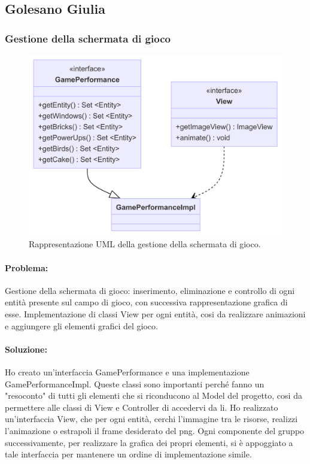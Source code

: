 \documentclass[a4paper,12pt]{report}
\begin{document}
\subsection{Golesano Giulia}

\subsubsection{Gestione della schermata di gioco }

\begin{figure}[H]
\centering{}
\includegraphics[width=\textwidth]{img/game.png}
\caption{Rappresentazione UML della gestione della schermata di gioco.}
\end{figure}

\paragraph{Problema:}
Gestione della schermata di gioco: inserimento, eliminazione e controllo di ogni entità presente sul campo di gioco, con successiva rappresentazione grafica di esse.
Implementazione di classi View per ogni entità, cosi da realizzare animazioni e aggiungere gli elementi grafici del gioco.

\paragraph{Soluzione:}
Ho creato un'interfaccia GamePerformance e una implementazione GamePerformanceImpl.
Queste classi sono importanti perché fanno un "resoconto" di tutti gli elementi che si riconducono al Model del progetto, cosi da permettere alle classi di View e Controller di accedervi da li.
Ho realizzato un'interfaccia View, che per ogni entità, cerchi l'immagine tra le risorse, realizzi l'animazione o estrapoli il frame desiderato del png.
Ogni componente del gruppo successivamente, per realizzare la grafica dei propri elementi, si è appoggiato a tale interfaccia per mantenere un ordine di implementazione simile.
\end{document}

